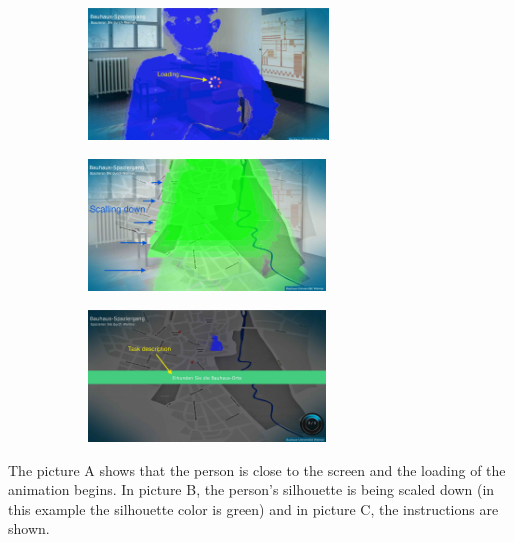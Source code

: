 \begin{enumerate}
\begin{figure}[H]
    \centering
    \begin{subfigure}[H]{0.32\textwidth}
        \centering
        \includegraphics[width=\textwidth,height = 3.5cm]{Figures/7/body_interactive/loading}
        \caption{}
        \label{fig:loading_logo}
    \end{subfigure}
    \begin{subfigure}[H]{0.32\textwidth}
        \centering
        \includegraphics[width=\textwidth,height = 3.5cm]{Figures/7/body_interactive/scalling_down}
        \caption{}
        \label{fig:scalling_down}
    \end{subfigure} 
      \begin{subfigure}[H]{0.32\textwidth}
        \centering
        \includegraphics[width=\textwidth,height = 3.5cm]{Figures/7/body_interactive/task_description}
        \caption{}
        \label{fig:task_description}
    \end{subfigure}
    \caption{}
    \label{fig:transition_sequence}
\end{figure}

The picture A shows that the person is close to the screen and the loading of the animation begins. In picture B, the person's silhouette is being scaled down (in this example the silhouette color is green) and in picture C, the instructions are shown.



\end{enumerate}
